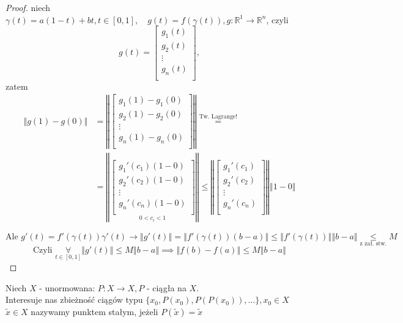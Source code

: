 \documentclass[../main.tex]{subfiles}
\begin{document}
\begin{proof}

niech $\gamma (t) = a(1-t) + bt, t\in [0,1], \quad g(t) = f(\gamma (t)),g: \mathbb{R}^1 \to \mathbb{R}^n$,
czyli
\[
    g(t) = \left [ \begin{matrix}
    g_1(t)\\
    g_2(t)\\
    \vdots\\
    g_n(t)\\ \end{matrix}\right ]
,\]
zatem
    \begin{align*}
        \left \Vert g(1)-g(0)\right \Vert &= \left \Vert \left [ \begin{matrix}
    g_1(1) - g_1(0)\\
    g_2(1) - g_2(0)\\
    \vdots\\
    g_n(1) - g_n(0)\\ \end{matrix}\right ] \right \Vert \overset{\text{Tw. Lagrange!}}{=}\\
        &=\left\Vert \underset{0<c_i<1}{\left [ \begin{matrix}
    g_1'(c_1)(1-0)\\
    g_2'(c_2)(1-0)\\
    \vdots\\
        g_n'(c_n)(1-0)\\ \end{matrix}\right ]}\right\Vert \leq \left\Vert \left [ \begin{matrix}
    g_1'(c_1)\\
    g_2'(c_2)\\
    \vdots\\
    g_n'(c_n)\\ \end{matrix}\right ] \right\Vert \left\Vert 1 - 0 \right\Vert
    \end{align*}

\[
    \text{Ale } g'(t) = f'(\gamma(t))\gamma'(t) \to \left\Vert g'(t)\right\Vert = \left\Vert f'(\gamma(t))(b-a)\right\Vert \leq \left\Vert f'(\gamma(t))\right\Vert \left\Vert b-a \right\Vert \underset{\text{z zał. stw.}}{\leq} M
\]
\[
    \text{Czyli }\underset{t\in[0,1]}{\forall}\left\Vert g'(t) \right\Vert \leq M\left\Vert b-a \right\Vert \implies \left\Vert f(b) - f(a) \right\Vert \leq M \left\Vert b - a \right\Vert
\]
\end{proof}


\begin{definicja}
Niech $X$ - unormowana: $P: X\to X, P$ - ciągła na $X$.\\
Interesuje nas zbieżność ciągów typu $\{x_0, P(x_0), P(P(x_0)),\dots \}, x_0\in X$\\
    $\tilde x \in X$ nazywamy punktem stałym, jeżeli $P(\tilde x) = \tilde x$
\end{definicja}
\end{document}

